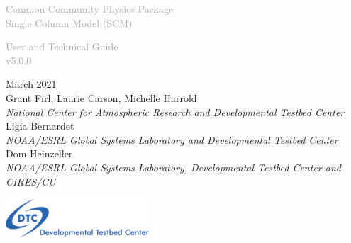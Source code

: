 \begin{titlepage}
\renewcommand{\thefootnote}{\fnsymbol{footnote}}

\vspace*{1em}
\noindent

\begin{center}
\textcolor{darkgray}{\bigsf Common Community Physics Package\\[0.5ex] Single Column Model (SCM)}
\vspace*{1em}\par

\textcolor{darkgray}{\bigst User and Technical Guide\\[0.5ex] v5.0.0}
\vspace*{1em}\par

\large{March 2021}\\

Grant Firl, Laurie Carson, Michelle Harrold\\
\textit{\small{National Center for Atmospheric Research and Developmental Testbed Center}}\\[4em]

Ligia Bernardet\\
\textit{\small{NOAA/ESRL Global Systems Laboratory and Developmental Testbed Center}}\\[4em]

Dom Heinzeller\\
\textit{\small{NOAA/ESRL Global Systems Laboratory, Developmental Testbed Center and CIRES/CU}}\\[4em]

\vspace{4em}

\includegraphics[width=0.4\textwidth]{images/dtc_logo.png}\\[2em]

\end{center}
\end{titlepage}
\pagebreak{}
